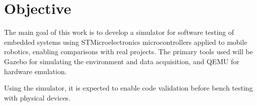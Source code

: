 \documentclass[../../monografia.tex]{subfiles}
\begin{document}
\section{Objective}
\label{Section: Objective}

The main goal of this work is to develop a simulator for software testing of embedded systems using STMicroelectronics microcontrollers applied to mobile robotics, enabling comparisons with real projects. The primary tools used will be Gazebo for simulating the environment and data acquisition, and QEMU for hardware emulation.

Using the simulator, it is expected to enable code validation before bench testing with physical devices.
\end{document}
